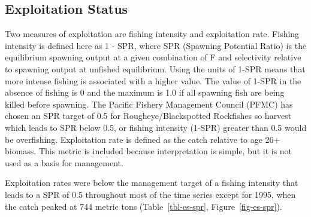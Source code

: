\documentclass[
]{scrartcl}
\begin{document}
\subsection{Exploitation Status}\label{exploitation-status}

Two measures of exploitation are fishing intensity and exploitation
rate. Fishing intensity is defined here as 1 - SPR, where SPR (Spawning
Potential Ratio) is the equilibrium spawning output at a given
combination of F and selectivity relative to spawning output at unfished
equilibrium. Using the units of 1-SPR means that more intense fishing is
associated with a higher value. The value of 1-SPR in the absence of
fishing is 0 and the maximum is 1.0 if all spawning fish are being
killed before spawning. The Pacific Fishery Management Council (PFMC)
has chosen an SPR target of 0.5 for Rougheye/Blackspotted Rockfishes so
harvest which leads to SPR below 0.5, or fishing intensity (1-SPR)
greater than 0.5 would be overfishing. Exploitation rate is defined as
the catch relative to age 26+ biomass. This metric is included because
interpretation is simple, but it is not used as a basis for management.

Exploitation rates were below the management target of a fishing
intensity that leads to a SPR of 0.5 throughout most of the time series
except for 1995, when the catch peaked at 744 metric tons
(Table~\ref{tbl-es-spr}, Figure~\ref{fig-es-spr}).

\begingroup
\fontsize{9.0pt}{10.8pt}\selectfont
\end{document}
